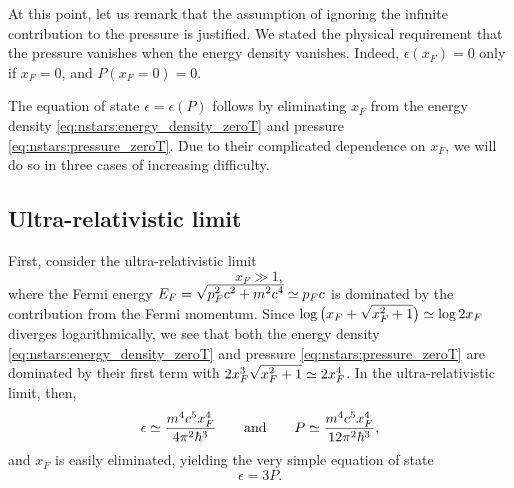 At this point, let us remark that the assumption of ignoring the infinite contribution to the pressure is justified.
We stated the physical requirement that the pressure vanishes when the energy density vanishes.
Indeed, $\epsilon(x_F) = 0$ only if $x_F = 0$, and $P(x_F=0) = 0$.

The equation of state $\epsilon = \epsilon(P)$ follows by eliminating $x_F$ from the energy density \eqref{eq:nstars:energy_density_zeroT} and pressure \eqref{eq:nstars:pressure_zeroT}.
Due to their complicated dependence on $x_F$, we will do so in three cases of increasing difficulty.

\subsection{Ultra-relativistic limit}
\label{sec:nstars:ur_limit}

First, consider the ultra-relativistic limit
\begin{equation}
	x_F \gg 1 , 
\label{eq:nstars:ur_limit}
\end{equation}
where the Fermi energy $E_F = \sqrt{\smash[b]{p_F^2 c^2 + m^2 c^4}} \simeq p_F c$ is dominated by the contribution from the Fermi momentum.
Since $\log \big( x_F + \sqrt{\smash[b]{x_F^2 + 1}} \big) \simeq \log 2 x_F$ diverges logarithmically, we see that both the energy density \eqref{eq:nstars:energy_density_zeroT} and pressure \eqref{eq:nstars:pressure_zeroT} are dominated by their first term with $2 x_F^3 \sqrt{\smash[b]{x_F^2 + 1}} \simeq 2 x_F^4$.
In the ultra-relativistic limit, then,
\begin{equation}
	\epsilon \simeq \frac{m^4 c^5 x_F^4}{4 \pi^2 \hbar^3}
	\qquad \text{and} \qquad
	P        \simeq \frac{m^4 c^5 x_F^4}{12 \pi^2 \hbar^3},
\end{equation}
and $x_F$ is easily eliminated, yielding the very simple equation of state
\begin{equation}
	\epsilon = 3 P .
\label{eq:nstars:ur_eos}
\end{equation}

